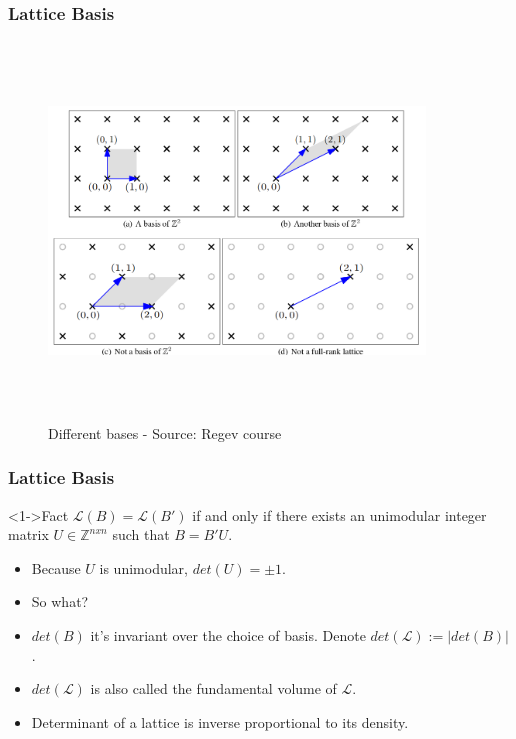 \documentclass{beamer}
\begin{document}
\begin{frame}
    \frametitle{Lattice Basis}
    \begin{figure}
            \includegraphics[width=10cm,height=10cm,keepaspectratio]{img/lattice_bases.png}
            \caption{Different bases - Source: Regev course}
        \end{figure}
\end{frame}
\begin{frame}
    \frametitle{Lattice Basis}
    \begin{block}<1->{Fact}
        $\mathcal{L}(B) = \mathcal{L}(B')$ if and only if there exists an unimodular integer matrix $U \in \mathbb{Z}^{nxn}$ such that $B = B'U$.
    \end{block} 
    \begin{itemize}
        \pause \item Because $U$ is unimodular, $det(U) = \pm 1$.
        \pause \item So what?
        \pause \item $det(B)$ it's invariant over the choice of basis. Denote $det(\mathcal{L}) := |det(B)|$.
        \pause \item $det(\mathcal{L})$ is also called the fundamental volume of $\mathcal{L}$.
        \pause \item Determinant of a lattice is inverse proportional to its density.
    \end{itemize}
\end{frame}
\end{document}
